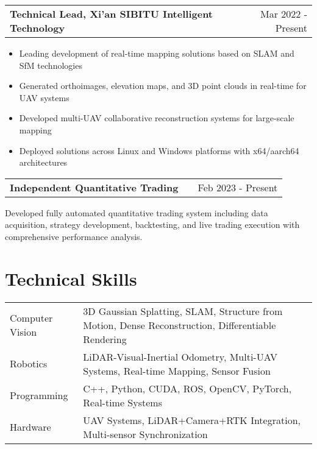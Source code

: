 \documentclass[a4paper,12pt]{article}
\makeatletter
\newenvironment{jobshort}[2]
    {
    \begin{tabularx}{\linewidth}{@{}l X r@{}}
    \textbf{#1} & \hfill &  #2 \\[3.75pt]
    \end{tabularx}
    }
    {
    }
\newenvironment{joblong}[2]
    {
    \begin{tabularx}{\linewidth}{@{}l X r@{}}
    \textbf{#1} & \hfill &  #2 \\[3.75pt]
    \end{tabularx}
    \begin{minipage}[t]{\linewidth}
    \begin{itemize}[nosep,after=\strut, leftmargin=1em, itemsep=3pt,label=--]
    }
    {
    \end{itemize}
    \end{minipage}    
    }
\makeatother
\begin{document}
\begin{joblong}{Technical Lead, Xi'an SIBITU Intelligent Technology}{Mar 2022 - Present}
\item Leading development of real-time mapping solutions based on SLAM and SfM technologies
\item Generated orthoimages, elevation maps, and 3D point clouds in real-time for UAV systems
\item Developed multi-UAV collaborative reconstruction systems for large-scale mapping
\item Deployed solutions across Linux and Windows platforms with x64/aarch64 architectures
\end{joblong}

\begin{jobshort}{Independent Quantitative Trading}{Feb 2023 - Present}
Developed fully automated quantitative trading system including data acquisition, strategy development, backtesting, and live trading execution with comprehensive performance analysis.
\end{jobshort}

\section{Technical Skills}
\begin{tabularx}{\linewidth}{@{}l X@{}}
Computer Vision &  \normalsize{3D Gaussian Splatting, SLAM, Structure from Motion, Dense Reconstruction, Differentiable Rendering}\\
Robotics  &  \normalsize{LiDAR-Visual-Inertial Odometry, Multi-UAV Systems, Real-time Mapping, Sensor Fusion}\\  
Programming &  \normalsize{C++, Python, CUDA, ROS, OpenCV, PyTorch, Real-time Systems}\\
Hardware &  \normalsize{UAV Systems, LiDAR+Camera+RTK Integration, Multi-sensor Synchronization}\\
\end{tabularx}

\vfill
{}
\end{document}
